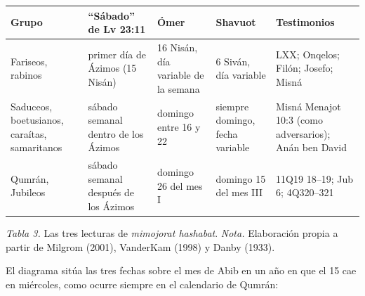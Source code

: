 \documentclass[11pt,letterpaper]{article}
\begin{document}
\begin{center}\begin{minipage}{\linewidth}\centering\footnotesize\renewcommand{\arraystretch}{1.15}
\begin{tabular}{@{}L{3.2cm}L{3.3cm}L{2.2cm}L{2.5cm}L{3.2cm}@{}}
\toprule
\textbf{Grupo} & \textbf{``Sábado'' de Lv 23:11} & \textbf{Ómer} & \textbf{Shavuot} & \textbf{Testimonios} \\ \midrule
Fariseos, rabinos & primer día de Ázimos (15 Nisán) & 16 Nisán, día variable de la semana & 6 Siván, día variable & LXX; Onqelos; Filón; Josefo; Misná \\
Saduceos, boetusianos, caraítas, samaritanos & sábado semanal dentro de los Ázimos & domingo entre 16 y 22 & siempre domingo, fecha variable & Misná Menajot 10:3 (como adversarios); Anán ben David \\
Qumrán, Jubileos & sábado semanal después de los Ázimos & domingo 26 del mes I & domingo 15 del mes III & 11Q19 18--19; Jub 6; 4Q320--321 \\
\bottomrule
\end{tabular}\par
{\footnotesize\color{sepia}\textit{Tabla 3.} Las tres lecturas de \emph{mimojorat hashabat}. \textit{Nota.} Elaboración propia a partir de Milgrom (2001), VanderKam (1998) y Danby (1933).}
\end{minipage}\end{center}

El diagrama sitúa las tres fechas sobre el mes de Abib en un año en que el 15 cae en miércoles, como ocurre siempre en el calendario de Qumrán:
\end{document}
